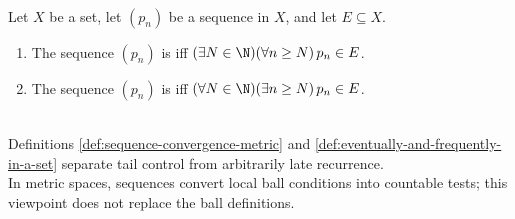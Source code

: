 \begin{definition} \label{def:eventually-and-frequently-in-a-set} \\
Let $X$ be a set, let $(p_n)$ be a sequence in $X$, and let $E\subseteq X$.
\begin{enumerate}[label=(\roman*)]
\setlength{\itemsep}{0pt}
\item The sequence $(p_n)$ is  iff $(\exists N\in\N)(\forall n\geq N)\,p_n\in E$.
\item The sequence $(p_n)$ is  iff $(\forall N\in\N)(\exists n\geq N)\,p_n\in E$.
\end{enumerate}
\end{definition}

\begin{perspective} \label{per:metric-sequences-as-topological-tests} \\
Definitions \ref{def:sequence-convergence-metric} and \ref{def:eventually-and-frequently-in-a-set} separate tail control from arbitrarily late recurrence.\\
In metric spaces, sequences convert local ball conditions into countable tests; this viewpoint does not replace the ball definitions.
\end{perspective}


